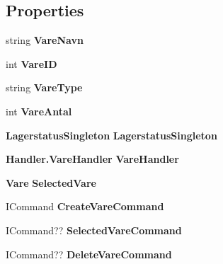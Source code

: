 \subsection*{Properties}
\begin{DoxyCompactItemize}
\item 
\mbox{\label{class_r_f_storage_1_1_view_model_1_1_lagerstatus_v_m_a214466f1a8a33e25020b7f206df45b52}} 
string {\bfseries Vare\+Navn}\hspace{0.3cm}{\ttfamily  [get, set]}
\item 
\mbox{\label{class_r_f_storage_1_1_view_model_1_1_lagerstatus_v_m_a919a049ce26462c056812530fcd85ec2}} 
int {\bfseries Vare\+ID}\hspace{0.3cm}{\ttfamily  [get, set]}
\item 
\mbox{\label{class_r_f_storage_1_1_view_model_1_1_lagerstatus_v_m_aa6438c104052864e048f2a8ceba0164c}} 
string {\bfseries Vare\+Type}\hspace{0.3cm}{\ttfamily  [get, set]}
\item 
\mbox{\label{class_r_f_storage_1_1_view_model_1_1_lagerstatus_v_m_a47ef980dd43b12806b80fd7c591f3777}} 
int {\bfseries Vare\+Antal}\hspace{0.3cm}{\ttfamily  [get, set]}
\item 
\mbox{\label{class_r_f_storage_1_1_view_model_1_1_lagerstatus_v_m_afd43bb2fed2a01b4c35ab20c8eaf1eb0}} 
\textbf{ Lagerstatus\+Singleton} {\bfseries Lagerstatus\+Singleton}\hspace{0.3cm}{\ttfamily  [get, set]}
\item 
\mbox{\label{class_r_f_storage_1_1_view_model_1_1_lagerstatus_v_m_a9188d798fbf75998a6dbc4afcd319eb2}} 
\textbf{ Handler.\+Vare\+Handler} {\bfseries Vare\+Handler}\hspace{0.3cm}{\ttfamily  [get, set]}
\item 
\mbox{\label{class_r_f_storage_1_1_view_model_1_1_lagerstatus_v_m_aec973014fee1ea52f14983c7df9c9cf1}} 
\textbf{ Vare} {\bfseries Selected\+Vare}\hspace{0.3cm}{\ttfamily  [get, set]}
\item 
\mbox{\label{class_r_f_storage_1_1_view_model_1_1_lagerstatus_v_m_af1e3d51fd5e6a066d834e8eb618187e5}} 
I\+Command {\bfseries Create\+Vare\+Command}\hspace{0.3cm}{\ttfamily  [get, set]}
\item 
\mbox{\label{class_r_f_storage_1_1_view_model_1_1_lagerstatus_v_m_a651ee3292d11689b79ad818cb127ff6e}} 
I\+Command?? {\bfseries Selected\+Vare\+Command}\hspace{0.3cm}{\ttfamily  [get, set]}
\item 
\mbox{\label{class_r_f_storage_1_1_view_model_1_1_lagerstatus_v_m_a188312dcc43a82410bd1cd931b7f18be}} 
I\+Command?? {\bfseries Delete\+Vare\+Command}\hspace{0.3cm}{\ttfamily  [get, set]}
\end{DoxyCompactItemize}
